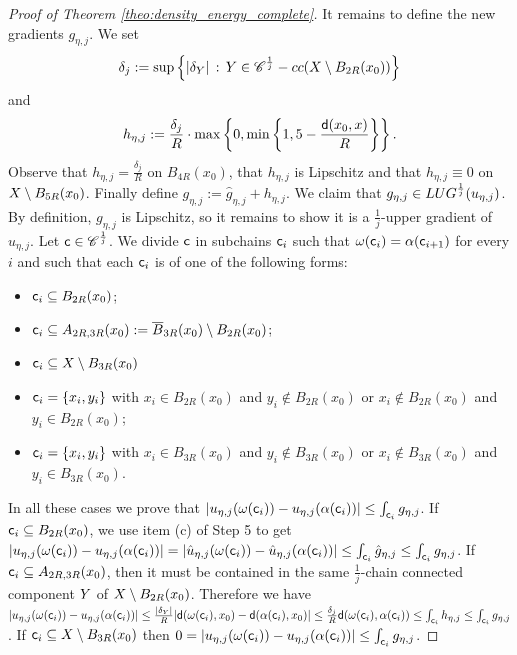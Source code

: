 \documentclass[12pt]{amsart}
\newcommand{\sfd}{{\sf d}}
\newcommand{\X}{{\rm X}}
\newcommand{\Y}{{\rm Y}}
\theoremstyle{definition}
\newcommand{\sfc}{{\sf c}}
\newcommand{\Chain}[1]{\mathscr{C}^{#1}}
\newcommand{\LUG}[1]{{\rm LUG}^{#1}}
\begin{document}
\begin{proof}[Proof of Theorem \ref{theo:density_energy_complete}]
        It remains to define the new gradients $g_{\eta,j}$. We set 
        $$\delta_j := \sup \left\{ \vert \delta_\Y \vert \,:\, \Y \in \Chain{\frac{1}{j}}\textup{-cc}(\X \setminus B_{2R}(x_0))\right\}$$
        and  
        $$h_{\eta,j} := \frac{\delta_j}{R} \cdot \max\left\{0,\min\left\{1, 5 - \frac{\sfd(x_0, x)}{R}\right\}\right\}.$$
        Observe that $h_{\eta,j} = \frac{\delta_j}{R}$ on $B_{4R}(x_0)$, that $h_{\eta,j}$ is Lipschitz and that $h_{\eta,j} \equiv 0$ on $\X\setminus B_{5R}(x_0)$. Finally define $g_{\eta,j} := \hat{g}_{\eta,j} + h_{\eta,j}$.
        We claim that $g_{\eta,j} \in \LUG{\frac{1}{j}}(u_{\eta,j})$. By definition, $g_{\eta,j}$ is Lipschitz, so it remains to show it is a $\frac{1}{j}$-upper gradient of $u_{\eta,j}$. Let $\sfc \in \Chain{\frac{1}{j}}$. We divide $\sfc$ in subchains $\sfc_i$ such that $\omega(\sfc_i) = \alpha(\sfc_{i+1})$ for every $i$ and such that each $\sfc_i$ is of one of the following forms: 
        \begin{itemize}
            \item $\sfc_i \subseteq B_{2R}(x_0)$;
            \item $\sfc_i \subseteq A_{2R,3R}(x_0) := \overline{B}_{3R}(x_0) \setminus B_{2R}(x_0)$;
            \item $\sfc_i \subseteq \X \setminus B_{3R}(x_0)$
            \item $\sfc_i = \{x_i,y_i\}$ with $x_i \in B_{2R}(x_0)$ and $y_i \notin B_{2R}(x_0)$ or $x_i \notin B_{2R}(x_0)$ and $y_i \in B_{2R}(x_0)$;
            \item $\sfc_i = \{x_i,y_i\}$ with $x_i \in B_{3R}(x_0)$ and $y_i \notin B_{3R}(x_0)$ or $x_i \notin B_{3R}(x_0)$ and $y_i \in B_{3R}(x_0)$.
        \end{itemize}
        In all these cases we prove that $\vert u_{\eta,j}(\omega(\sfc_i)) - u_{\eta,j}(\alpha(\sfc_i)) \vert \le \int_{\sfc_i}g_{\eta,j}$.
         If $\sfc_i \subseteq B_{2R}(x_0)$, we use item (c) of Step 5 to get $\vert u_{\eta,j}(\omega(\sfc_i)) - u_{\eta,j}(\alpha(\sfc_i)) \vert = \vert \hat{u}_{\eta,j}(\omega(\sfc_i)) - \hat{u}_{\eta,j}(\alpha(\sfc_i)) \vert \le \int_{\sfc_i} \hat{g}_{\eta,j} \le \int_{\sfc_i} g_{\eta,j}$. If $\sfc_i \subseteq A_{2R,3R}(x_0)$, then it must be contained in the same $\frac{1}{j}$-chain connected component $\Y$ of $\X \setminus B_{2R}(x_0)$. Therefore we have $\vert u_{\eta,j}(\omega(\sfc_i)) - u_{\eta,j}(\alpha(\sfc_i)) \vert \le \frac{\vert \delta_Y \vert}{R}\vert \sfd(\omega(\sfc_i),x_0) - \sfd(\alpha(\sfc_i),x_0) \vert \le \frac{\delta_j}{R} \sfd(\omega(\sfc_i),\alpha(\sfc_i)) \le \int_{\sfc_i} h_{\eta,j} \le \int_{\sfc_i} g_{\eta,j}$. If $\sfc_i \subseteq \X \setminus B_{3R}(x_0)$ then $ 0 = \vert u_{\eta,j}(\omega(\sfc_i)) - u_{\eta,j}(\alpha(\sfc_i)) \vert \le \int_{\sfc_i} g_{\eta,j}$.

\end{proof}
\end{document}
